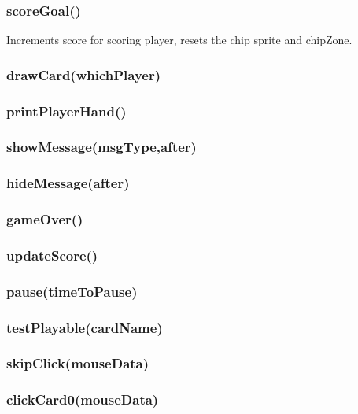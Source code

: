 \documentclass[12pt]{article}
\begin{document}
\subsubsection*{scoreGoal()}
Increments score for scoring player, resets the chip sprite and 
chipZone. 
\subsubsection*{drawCard(whichPlayer)}

\subsubsection*{printPlayerHand()}

\subsubsection*{showMessage(msgType,after)}

\subsubsection*{hideMessage(after)}

\subsubsection*{gameOver()}

\subsubsection*{updateScore()}

\subsubsection*{pause(timeToPause)}

\subsubsection*{testPlayable(cardName)}

\subsubsection*{skipClick(mouseData)}

\subsubsection*{clickCard0(mouseData)}
\end{document}
